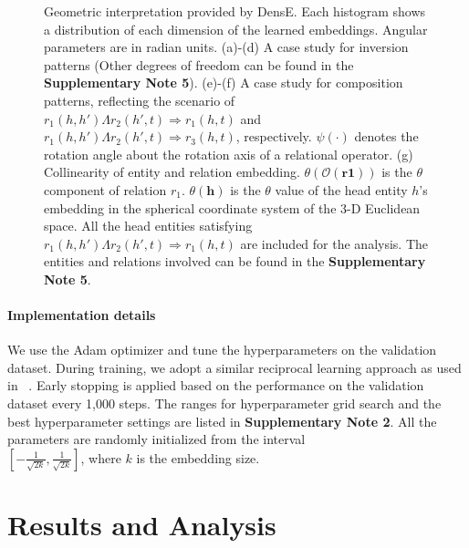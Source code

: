 \documentclass[11pt]{article}
\begin{document}
\begin{figure*}[!ht]
\hspace{0.5cm}
\caption{Geometric interpretation provided by DensE. Each histogram shows a distribution of each dimension of the learned embeddings. Angular parameters are in radian units. (a)-(d) A case study for inversion patterns (Other degrees of freedom can be found in the \textbf{Supplementary Note 5}). (e)-(f) A case study for composition patterns, reflecting the scenario of \(r_1(h, h') \Lambda r_2(h', t) \Rightarrow r_1(h, t) \) and \(r_1(h, h') \Lambda r_2(h', t) \Rightarrow r_3(h, t) \), respectively. \(\psi(\cdot)\) denotes the rotation angle about the rotation axis of a relational operator. (g) Collinearity of entity and relation embedding. \(\theta(\mathcal{O}(\textbf{r1}))\) is the \(\theta\) component of relation \(r_1\). \(\theta(\textbf{h})\) is the \(\theta\) value of the head entity \(h\)'s embedding in the spherical coordinate system of the 3-D Euclidean space. All the head entities satisfying \(r_1(h, h') \Lambda r_2(h', t) \Rightarrow r_1(h, t) \) are included for the analysis.  The entities and relations involved can be found in the \textbf{Supplementary Note 5}.}
\label{Fig:Geo}
\end{figure*}

\paragraph{Implementation details} We use the Adam optimizer and tune the hyperparameters on the validation dataset. During training, we adopt a similar reciprocal learning approach as used in ~\cite{Lacroix2018CanonicalTD, zhang2019quaternion}. Early stopping is applied based on the performance on the validation dataset every 1,000 steps. The ranges for hyperparameter grid search and the best hyperparameter settings are listed in \textbf{Supplementary Note 2}. All the parameters are randomly initialized from the interval \\
\([-\frac{1}{\sqrt{2k}}, \frac{1}{\sqrt{2k}}]\), where \(k\) is the embedding size. 

\section{Results and Analysis}
\end{document}
